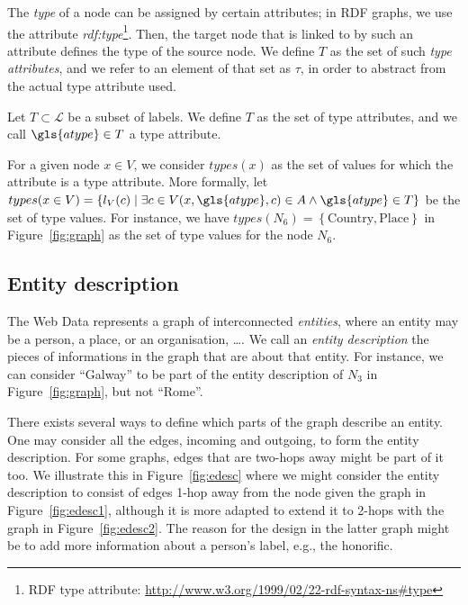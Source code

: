 The \emph{type} of a node can be assigned by certain attributes; in RDF graphs, we use the attribute \emph{rdf:type}\footnote{RDF type attribute: \url{http://www.w3.org/1999/02/22-rdf-syntax-ns\#type}}. Then, the target node that is linked to by such an attribute defines the type of the source node. We define $T$ as the set of such \emph{type attributes}, and we refer to an element of that set as $\tau$, in order to abstract from the actual type attribute used.

\begin{definition}
Let $T \subset \mathcal{L}$ be a subset of labels.
We define $T$ as the set of type attributes, and we call $\gls{atype} \in T$ a type attribute.
\end{definition}

For a given node $x \in V$, we consider $types(x)$ as the set of values for which the attribute is a type attribute. More formally, let $types(x\in V) = \left\lbrace l_V(c) \mid \exists c \in V (x, \gls{atype}, c) \in A \wedge \gls{atype} \in T \right\rbrace$ be the set of type values. For instance, we have $types\left(N_6\right) = \left\{ \text{Country}, \text{Place} \right\}$ in Figure~\ref{fig:graph} as the set of type values for the node $N_6$.

\subsection{Entity description}
\label{sec:entity-description}

The Web Data represents a graph of interconnected \emph{entities}, where an entity may be a person, a place, or an organisation, \ldots. We call an \emph{entity description} the pieces of informations in the graph that are about that entity. For instance, we can consider ``Galway'' to be part of the entity description of $N_3$ in Figure~\ref{fig:graph}, but not ``Rome''.

There exists several ways to define which parts of the graph describe an entity. One may consider all the edges, incoming and outgoing, to form the entity description. For some graphs, edges that are two-hops away might be part of it too. We illustrate this in Figure~\ref{fig:edesc} where we might consider the entity description to consist of edges 1-hop away from the node given the graph in Figure~\ref{fig:edesc1}, although it is more adapted to extend it to 2-hops with the graph in Figure~\ref{fig:edesc2}. The reason for the design in the latter graph might be to add more information about a person's label, e.g., the honorific.

